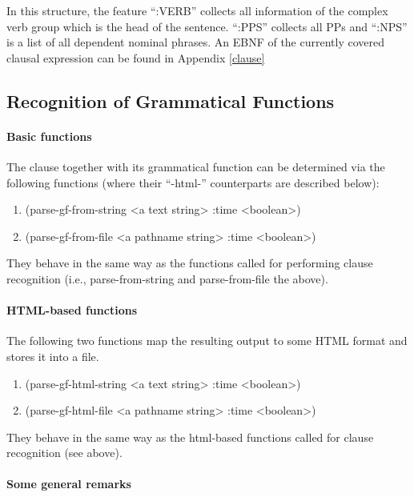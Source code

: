 In this structure, the feature ``:VERB'' collects all information of the
complex verb group which is the head of the sentence. ``:PPS'' collects
all PPs and ``:NPS'' is a list of all dependent nominal phrases.
An EBNF of the currently covered clausal expression can be found in
Appendix \ref{clause}

\subsection{Recognition of Grammatical Functions}
\paragraph{Basic functions}
The clause together with its grammatical function can be determined
via the following
functions (where their ``{\sc -html-}'' counterparts are described below):
\begin{enumerate}

\item   {\sc (parse-gf-from-string <a text string>  :time <boolean>)}
\item   {\sc (parse-gf-from-file <a pathname string> :time <boolean>)}

\end{enumerate}

They behave in the same way as the functions called for performing clause
recognition (i.e., {\sc parse-from-string} and {\sc parse-from-file}
the above).

\paragraph{HTML-based functions}

The following two functions map the resulting output to some HTML
format and stores it into a file.
\begin{enumerate}

\item   {\sc (parse-gf-html-string <a text string>  :time <boolean>)}
\item   {\sc (parse-gf-html-file <a pathname string> :time <boolean>)}

\end{enumerate}

They behave in the same way as the {\sc html}-based functions called for
clause recognition (see above).

\paragraph{Some general remarks}

